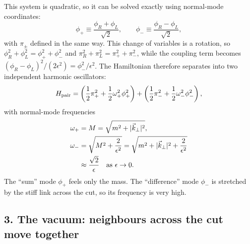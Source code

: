 This system is quadratic, so it can be solved exactly using normal-mode coordinates:
\begin{equation}
\phi_+ \equiv \frac{\phi_R + \phi_L}{\sqrt{2}}, \qquad \phi_- \equiv \frac{\phi_R - \phi_L}{\sqrt{2}} ,
\label{eq:normal_mode_coords}
\end{equation}
with $\pi_\pm$ defined in the same way. This change of variables is a rotation, so
$\phi_R^2+\phi_L^2=\phi_+^2+\phi_-^2$ and $\pi_R^2+\pi_L^2=\pi_+^2+\pi_-^2$, while the coupling term becomes
$(\phi_R-\phi_L)^2/(2\epsilon^2)=\phi_-^2/\epsilon^2$. The Hamiltonian therefore separates into two
independent harmonic oscillators:
\begin{equation}
H_{\rm pair} = \left( \frac{1}{2}\pi_+^2 + \frac{1}{2}\omega_+^2 \phi_+^2 \right)
+ \left( \frac{1}{2}\pi_-^2 + \frac{1}{2}\omega_-^2 \phi_-^2 \right),
\label{eq:decoupled_pair_hamiltonian}
\end{equation}
with normal-mode frequencies
\begin{align}
\omega_+ &= M = \sqrt{m^2 + |\vec k_\perp|^2}, \label{eq:omega_plus} \\
\omega_- &= \sqrt{M^2 + \frac{2}{\epsilon^2}} = \sqrt{m^2 + |\vec k_\perp|^2 + \frac{2}{\epsilon^2}}
\notag\\
&\approx \frac{\sqrt{2}}{\epsilon} \quad \text{as } \epsilon \to 0 . \label{eq:omega_minus}
\end{align}
The ``sum'' mode $\phi_+$ feels only the mass. The ``difference'' mode $\phi_-$ is stretched by the stiff
link across the cut, so its frequency is very high.

\subsection*{3. The vacuum: neighbours across the cut move together}

